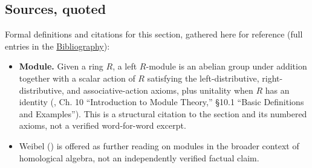 \subsection{Sources, quoted}\label{sec:11-modules:01-definition:2}

Formal definitions and citations for this section, gathered here for reference (full entries in the \hyperref[sec:root:bibliography:1]{Bibliography}):

\begin{itemize}
\tightlist
\item
  \textbf{Module.} Given a ring \(R\), a left \(R\)-module is an abelian group under addition together with a scalar action of \(R\) satisfying the left-distributive, right-distributive, and associative-action axioms, plus unitality when \(R\) has an identity (\cite{DummitFoote2003}, Ch. 10 ``Introduction to Module Theory,'' §10.1 ``Basic Definitions and Examples''). This is a structural citation to the section and its numbered axioms, not a verified word-for-word excerpt.
\item
  Weibel (\cite{Weibel1994}) is offered as further reading on modules in the broader context of homological algebra, not an independently verified factual claim.
\end{itemize}
